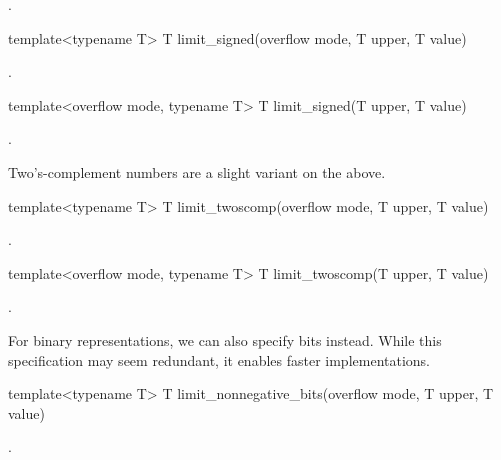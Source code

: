 \begin{itemdescr}
\returns {}.	
\end{itemdescr}

\begin{itemdecl}
template<typename T> T limit_signed(overflow mode, T upper, T value)		
\end{itemdecl}

\begin{itemdescr}
\returns {}.	
\end{itemdescr}

\begin{itemdecl}
template<overflow mode, typename T> T limit_signed(T upper, T value)		
\end{itemdecl}

\begin{itemdescr}
\returns {}.	
\end{itemdescr}

Two's-complement numbers are a slight variant on the above.

\begin{itemdecl}
template<typename T> T limit_twoscomp(overflow mode, T upper, T value)		
\end{itemdecl}

\begin{itemdescr}
\returns {}.
\end{itemdescr}

\begin{itemdecl}
template<overflow mode, typename T> T limit_twoscomp(T upper, T value)		
\end{itemdecl}

\begin{itemdescr}
\returns {}.	
\end{itemdescr}

For binary representations, we can also specify bits instead. While this specification may seem redundant, it enables faster implementations.

\begin{itemdecl}
template<typename T> T limit_nonnegative_bits(overflow mode, T upper, T value)		
\end{itemdecl}

\begin{itemdescr}
\returns {}.	
\end{itemdescr}

